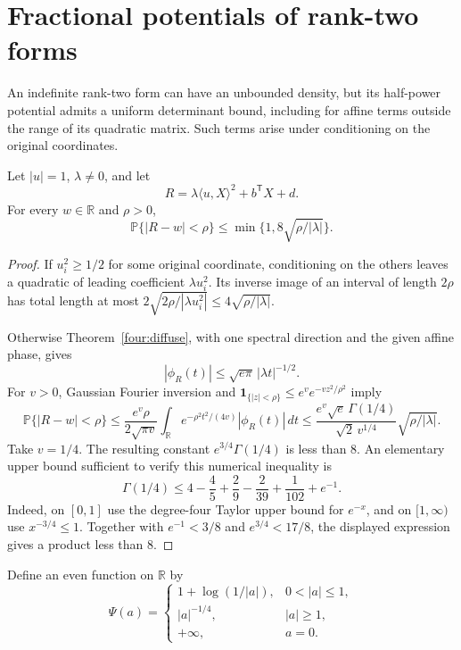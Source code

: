 \section{Fractional potentials of rank-two forms}
\label{sec:rank-two}

An indefinite rank-two form can have an unbounded density,
but its half-power potential admits a uniform determinant
bound, including for affine terms outside the range of its
quadratic matrix.  Such terms arise under conditioning on
the original coordinates.

\begin{lemma}
\label{rt:rank-one}
Let \(|u|=1\), \(\lambda\ne0\), and let
\[
 R=\lambda\langle u,X\rangle^2+b^{\mathsf T}X+d.
\]
For every \(w\in\mathbb R\) and \(\rho>0\),
\[
 \mathbb P\{|R-w|<\rho\}
 \leq\min\{1,8\sqrt{\rho/|\lambda|}\}.
\]
\end{lemma}
\begin{proof}
If \(u_i^2\geq1/2\) for some original coordinate, conditioning
on the others leaves a quadratic of leading coefficient
\(\lambda u_i^2\).  Its inverse image of an interval of
length \(2\rho\) has total length at most
\(2\sqrt{2\rho/|\lambda u_i^2|}\leq4\sqrt{\rho/|\lambda|}\).

Otherwise Theorem~\ref{four:diffuse}, with one spectral
direction and the given affine phase, gives
\[
 |\phi_R(t)|\leq\sqrt{e\pi}\,|\lambda t|^{-1/2}.
\]
For \(v>0\), Gaussian Fourier inversion and
\(\boldsymbol1_{\{|z|<\rho\}}\leq e^v e^{-vz^2/\rho^2}\)
imply
\[
 \mathbb P\{|R-w|<\rho\}
 \leq
 \frac{e^v\rho}{2\sqrt{\pi v}}
 \int_{\mathbb R}e^{-\rho^2t^2/(4v)}|\phi_R(t)|\,dt
 \leq
 \frac{e^v\sqrt e\,\Gamma(1/4)}
 {\sqrt2\,v^{1/4}}\sqrt{\rho/|\lambda|}.
\]
Take \(v=1/4\).  The resulting constant
\(e^{3/4}\Gamma(1/4)\) is less than \(8\).
An elementary upper bound sufficient to verify this
numerical inequality is
\[
 \Gamma(1/4)\leq
 4-\frac45+\frac29-\frac2{39}+\frac1{102}+e^{-1}.
\]
Indeed, on \([0,1]\) use the degree-four Taylor upper
bound for \(e^{-x}\), and on \([1,\infty)\) use
\(x^{-3/4}\leq1\).  Together with
\(e^{-1}<3/8\) and \(e^{3/4}<17/8\), the displayed
expression gives a product less than \(8\).
\end{proof}

Define an even function on \(\mathbb R\) by
\[
 \Psi(a)=
 \begin{cases}
 1+\log(1/|a|),&0<|a|\leq1,\\
 |a|^{-1/4},&|a|\geq1,\\
 +\infty,&a=0.
 \end{cases}
\]

